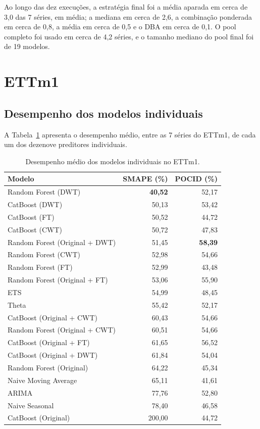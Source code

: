 Ao longo das dez execuções, a estratégia final foi a média aparada em cerca de 3,0 das 7 séries, em média; a mediana em cerca de 2,6, a combinação ponderada em cerca de 0,8, a média em cerca de 0,5 e o DBA em cerca de 0,1. O pool completo foi usado em cerca de 4,2 séries, e o tamanho mediano do pool final foi de 19 modelos.

\section{ETTm1} \label{sec:resultados-ettm1}

\subsection{Desempenho dos modelos individuais}

A Tabela~\ref{tab:ettm1-individual} apresenta o desempenho médio, entre as 7 séries do ETTm1, de cada um dos dezenove preditores individuais.

\begin{table}[H]
\centering
\caption{Desempenho médio dos modelos individuais no ETTm1.}
\label{tab:ettm1-individual}
\begin{tabular}{@{}lrr@{}}
\toprule
\textbf{Modelo} & \textbf{SMAPE (\%)} & \textbf{POCID (\%)} \\
\midrule
Random Forest (DWT)                  & \textbf{40,52} & 52,17 \\
CatBoost (DWT)                       & 50,13 & 53,42 \\
CatBoost (FT)                        & 50,52 & 44,72 \\
CatBoost (CWT)                       & 50,72 & 47,83 \\
Random Forest (Original + DWT)       & 51,45 & \textbf{58,39} \\
Random Forest (CWT)                  & 52,98 & 54,66 \\
Random Forest (FT)                   & 52,99 & 43,48 \\
Random Forest (Original + FT)        & 53,06 & 55,90 \\
ETS                                  & 54,99 & 48,45 \\
Theta                                & 55,42 & 52,17 \\
CatBoost (Original + CWT)            & 60,43 & 54,66 \\
Random Forest (Original + CWT)       & 60,51 & 54,66 \\
CatBoost (Original + FT)             & 61,65 & 56,52 \\
CatBoost (Original + DWT)            & 61,84 & 54,04 \\
Random Forest (Original)             & 64,22 & 45,34 \\
Naive Moving Average                 & 65,11 & 41,61 \\
ARIMA                                & 77,76 & 52,80 \\
Naive Seasonal                       & 78,40 & 46,58 \\
CatBoost (Original)                  & 200,00 & 44,72 \\
\bottomrule
\end{tabular}
\end{table}

